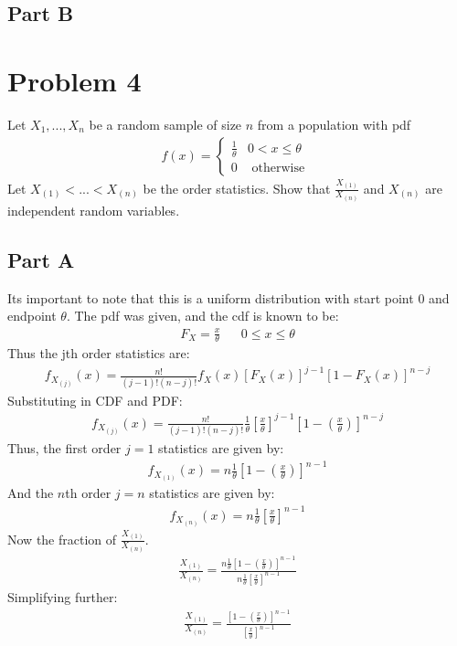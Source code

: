 \documentclass{article}
\begin{document}
\subsection*{Part B}


\clearpage
\section*{Problem 4}
 Let $X_1,...,X_n$ be a random sample of size $n$ from a population with pdf
 \begin{align*}
 f(x) = \begin{cases} 
      \frac{1}{\theta} & 0<x\leq \theta \\
       0 & \text{ otherwise } 
   \end{cases}
\end{align*}
Let $X_{(1)}<...< X_{(n)}$ be the order statistics. Show that $\frac{X_{(1)}}{X_{(n)}}$ and $X_{(n)}$ are independent
random variables.
\subsection*{Part A}
Its important to note that this is a uniform distribution with start point $0$ and endpoint $\theta$.
The pdf was given, and the cdf is known to be:
\begin{align*}
F_X = \frac{x}{\theta} && 0 \leq x \leq \theta
\end{align*}
Thus the jth order statistics are:
\begin{align*}
f_{X_{(j)}}(x) = \frac{n!}{(j-1)!(n-j)!} f_X(x) [F_X(x)]^{j-1} [1-F_X(x)]^{n-j}
\end{align*}
Substituting in CDF and PDF:
\begin{align*}
f_{X_{(j)}}(x) = \frac{n!}{(j-1)!(n-j)!} \frac{1}{\theta} [\frac{x}{\theta}]^{j-1} [1-(\frac{x}{\theta})]^{n-j}
\end{align*}
Thus, the first order $j=1$ statistics are given by:
\begin{align*}
f_{X_{(1)}}(x) = n \frac{1}{\theta} [1-(\frac{x}{\theta})]^{n-1}
\end{align*}
And the $n$th order $j=n$ statistics are given by:
\begin{align*}
f_{X_{(n)}}(x) = n \frac{1}{\theta} [\frac{x}{\theta}]^{n-1}
\end{align*}
Now the fraction of $\frac{X_{(1)}}{X_{(n)}}$.
\begin{align*}
\frac{X_{(1)}}{X_{(n)}} = \frac{n \frac{1}{\theta} [1-(\frac{x}{\theta})]^{n-1}}{n \frac{1}{\theta} [\frac{x}{\theta}]^{n-1}}
\end{align*}
Simplifying further:
\begin{align*}
\frac{X_{(1)}}{X_{(n)}} = \frac{[1-(\frac{x}{\theta})]^{n-1}}{[\frac{x}{\theta}]^{n-1}}
\end{align*}
\end{document}
